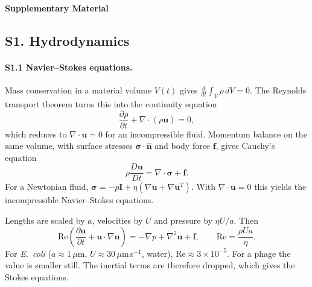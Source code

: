 \clearpage
\renewcommand{\thefigure}{S.\arabic{figure}}
\renewcommand{\thetable}{S.\arabic{table}}
\renewcommand{\theequation}{S.\arabic{equation}}
\setcounter{figure}{0}
\setcounter{table}{0}
\setcounter{equation}{0}

 {\LARGE \noindent \textbf{Supplementary Material}}

\subsection*{S1. Hydrodynamics}

\paragraph{S1.1 Navier--Stokes equations.} Mass conservation in a material volume $V(t)$ gives $\frac{d}{dt}\int_V\rho\,dV=0$. The Reynolds transport theorem turns this into the continuity equation
\begin{equation}
\frac{\partial\rho}{\partial t}+\nabla\cdot(\rho\bm u)=0 ,
\end{equation}
which reduces to $\nabla\cdot\bm u=0$ for an incompressible fluid. Momentum balance on the same volume, with surface stresses $\bm\sigma\cdot\hat{\bm n}$ and body force $\bm f$, gives Cauchy's equation
\begin{equation}
\rho\frac{D\bm u}{Dt}=\nabla\cdot\bm\sigma+\bm f .
\end{equation}
For a Newtonian fluid, $\bm\sigma=-p\bm I+\eta\left(\nabla\bm u+\nabla\bm u^{T}\right)$. With $\nabla\cdot\bm u=0$ this yields the incompressible Navier--Stokes equations.

Lengths are scaled by $a$, velocities by $U$ and pressure by $\eta U/a$. Then
\begin{equation}
\mathrm{Re}\left(\frac{\partial\bm u}{\partial t}+\bm u\cdot\nabla\bm u\right)=-\nabla p+\nabla^2\bm u+\bm f,\qquad \mathrm{Re}=\frac{\rho Ua}{\eta}.
\end{equation}
For \textit{E.~coli} ($a\approx1\,\mu$m, $U\approx30\,\mu$m\,s$^{-1}$, water), $\mathrm{Re}\approx3\times10^{-5}$. For a phage the value is smaller still. The inertial terms are therefore dropped, which gives the Stokes equations\cite{purcell1977life,happel1983}.

